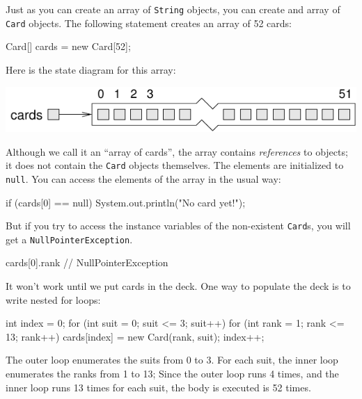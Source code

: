 \documentclass[12pt]{book}
\theoremstyle{exercise}
\newcommand{\java}[1]{\verb"#1"}
\newcommand{\java}[1]{\lstinline{#1}} %
\begin{document}
Just as you can create an array of \java{String} objects, you can create and array of \java{Card} objects.
The following statement creates an array of 52 cards:

\begin{code}
    Card[] cards = new Card[52];
\end{code}


Here is the state diagram for this array:

\begin{center}
\includegraphics{figs/cardarray.pdf}
\end{center}


Although we call it an ``array of cards'', the array contains {\em references} to objects; it does not contain the \java{Card} objects themselves.
The elements are initialized to \java{null}.
You can access the elements of the array in the usual way:

\begin{code}
    if (cards[0] == null) {
        System.out.println("No card yet!");
    }
\end{code}


But if you try to access the instance variables of the non-existent \java{Card}s, you will get a \java{NullPointerException}.

\begin{code}
    cards[0].rank      // NullPointerException
\end{code}


It won't work until we put cards in the deck.
One way to populate the deck is to write nested for loops:

\begin{code}
    int index = 0;
    for (int suit = 0; suit <= 3; suit++) {
        for (int rank = 1; rank <= 13; rank++) {
            cards[index] = new Card(rank, suit);
            index++;
        }
    }
\end{code}

The outer loop enumerates the suits from 0 to 3.
For each suit, the inner loop enumerates the ranks from 1 to 13;
Since the outer loop runs 4 times, and the inner loop runs 13 times for each suit, the body is executed is 52 times.
\end{document}
